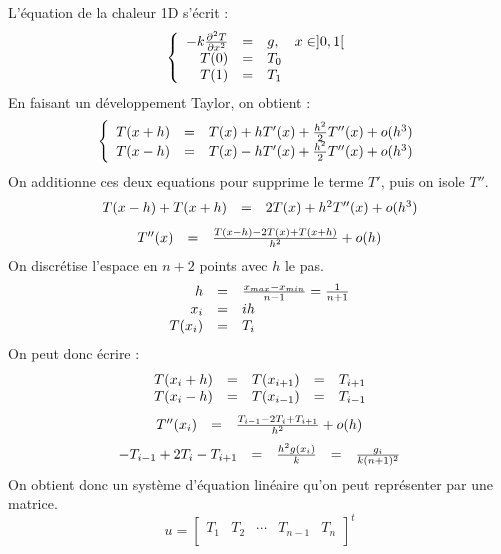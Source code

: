 \documentclass{article}
\begin{document}
L'équation de la chaleur 1D s'écrit :
\[
	\left \{
	\begin{array}{r c l}
		-k \frac{\partial^2 T}{\partial x^2} & = & g,\quad x \in ]0,1[ \\
		T(0) & = & T_0 \\
		T(1) & = & T_1 \\
	\end{array}
	\right .
\]
En faisant un développement Taylor, on obtient :
\[
	\left \{
	\begin{array}{r c l}
		T(x+h) & = & T(x) + hT'(x) + \frac{h^2}{2} T''(x) + o(h^3)\\
		T(x-h) & = & T(x) - hT'(x) + \frac{h^2}{2} T''(x) + o(h^3)\\
	\end{array}
	\right .
\]
On additionne ces deux equations pour supprime le terme $T'$, puis on isole $T''$.
\[
	\begin{array}{r c l}
		T(x-h)+T(x+h) & = & 2T(x) + h^2 T''(x) + o(h^3)\\
	\end{array}
\]
\[
	\begin{array}{r c l}
		T''(x) & = & \frac{T(x-h) - 2T(x) + T(x+h)}{h^2}  + o(h)\\
	\end{array}
\]
On discrétise l'espace en $n+2$ points avec $h$ le pas.
\[
	\begin{array}{r c l}
	h & = & \frac{x_{max} - x_{min}}{n-1} = \frac{1}{n+1} \\
	x_i & = & ih \\
	T(x_i) & = & T_i \\
	\end{array}
\]
On peut donc écrire :
\[
	\begin{array}{r c c c l}
	T(x_i + h) & = & T(x_{i+1}) & = & T_{i+1} \\
	T(x_i - h) & = & T(x_{i-1}) & = & T_{i-1} \\
	\end{array}
\]
\[
	\begin{array}{r c l}
		T''(x_i) & = & \frac{T_{i-1} - 2T_i + T_{i+1}}{h^2}  + o(h)\\
	\end{array}
\]
\[
	\begin{array}{r c c c l}
		-T_{i-1} + 2T_i - T_{i+1} & = & \frac{h^2g(x_i)}{k} & = & \frac{g_i}{k(n+1)^2}\\
	\end{array}
\]
On obtient donc un système d'équation linéaire qu'on peut représenter par une matrice.
\[
	u = 
	\begin{bmatrix}
		T_1 & T_2 & \cdots & T_{n-1} & T_n \\
	\end{bmatrix}^t
\]
\end{document}
